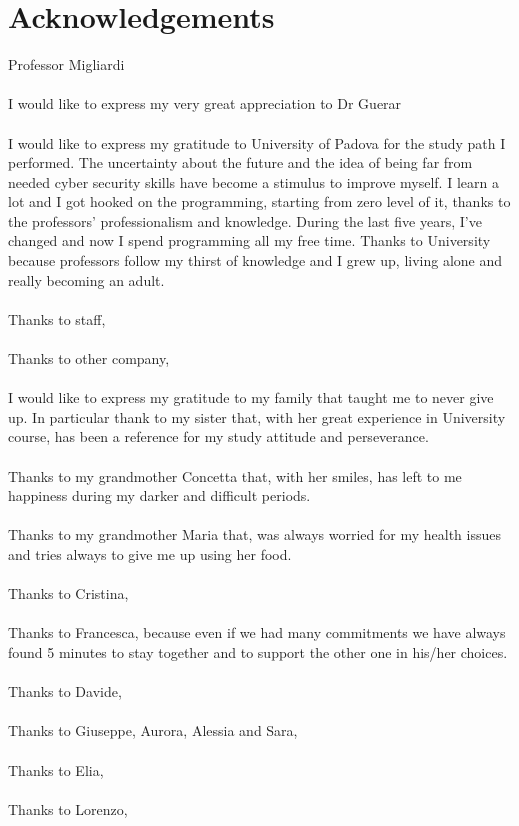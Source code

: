 \chapter*{Acknowledgements}
\renewcommand\chaptermark[1]{\markboth{\uppercase{#1}}{}}
\chaptermark{Acknowledgments}
Professor Migliardi\\\\
I would like to express my very great appreciation to Dr Guerar\\\\
I would like to express my gratitude to University of Padova for the study path I performed. The uncertainty about the future and the idea of being far from needed cyber security skills have become a stimulus to improve myself. I learn a lot and I got hooked on the programming, starting from zero level of it, thanks to the professors' professionalism and knowledge. During the last five years, I've changed and now I spend programming all my free time. Thanks to University because professors follow my thirst of knowledge and I grew up, living alone and really becoming an adult.\\\\
Thanks to staff,\\\\
Thanks to other company,\\\\
I would like to express my gratitude to my family that taught me to never give up. In particular thank to my sister that, with her great experience in University course, has been a reference for my study attitude and perseverance.\\\\
Thanks to my grandmother Concetta that, with her smiles, has left to me happiness during my darker and difficult periods.\\\\
Thanks to my grandmother Maria that, was always worried for my health issues and tries always to give me up using her food. \\\\
Thanks to Cristina,\\\\
Thanks to Francesca, because even if we had many commitments we have always found 5 minutes to stay together and to support the other one in his/her choices.\\\\
Thanks to Davide,\\\\
Thanks to Giuseppe, Aurora, Alessia and Sara,\\\\
Thanks to Elia,\\\\
Thanks to Lorenzo,\\\\